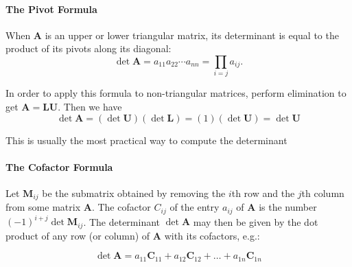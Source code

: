 \documentclass[10pt,landscape,letterpaper]{article}
\newcommand{\matr}[1]{\mathbf{#1}}
\begin{document}
\begin{multicols}{3}
\paragraph{The Pivot Formula}

When $\matr{A}$ is an upper or lower triangular matrix, its determinant is equal to the product of its pivots along its diagonal:
\begin{equation*}
\det \matr{A} = a_{11} a_{22} \cdots a_{nn} = \prod_{i = j} a_{ij}.
\end{equation*}

In order to apply this formula to non-triangular matrices, perform elimination to get $\matr{A=LU}$. Then we have
\begin{equation*}
\det \matr{A} = (\det \matr{U})(\det \matr{L}) = (1)(\det \matr{U}) = \det \matr{U}
\end{equation*}

This is usually the most practical way to compute the determinant

\paragraph{The Cofactor Formula} \label{det-cofactor}

Let $\matr{M}_{ij}$ be the submatrix obtained by removing the $i$th row and the $j$th column from some matrix $\matr{A}$. The cofactor $C_{ij}$ of the entry $a_{ij}$ of $\matr{A}$ is the number $(-1)^{i+j} \det \matr{M}_{ij}$. The determinant $\det \matr{A}$ may then be given by the dot product of any row (or column) of $\matr{A}$ with its cofactors, e.g.:

\begin{equation*}
\boxed{\det \matr{A} = a_{11} \matr{C}_{11} + a_{12} \matr{C}_{12} + \dots + a_{1n} \matr{C}_{1n}}
\end{equation*}


\end{multicols}
\end{document}
